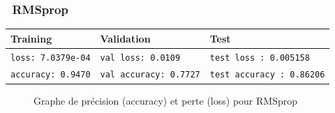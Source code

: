 	\subsubsection*{\qquad \textbullet \ RMSprop}
		\begin{table}[H]
			\centering
			\begin{tabular}{l|l|l}
				\hline
				\textbf{Training} & \textbf{Validation} & \textbf{Test} \\
				\hline

				\texttt{loss: 7.0379e-04} & \texttt{val loss: 0.0109} & \texttt{test loss : 0.005158} \\
				\texttt{accuracy: 0.9470} & \texttt{val accuracy: 0.7727} & \texttt{test accuracy : 0.86206} \\
				
				\hline
				
			\end{tabular}
		\end{table}
		\begin{figure}[H]
			\myfloatalign
			 \quad
			
			\caption[]{Graphe de précision (accuracy) et perte (loss)  pour RMSprop}
		\end{figure}


